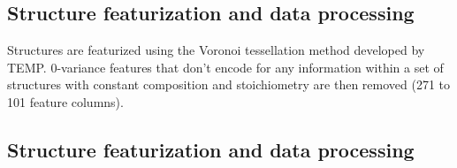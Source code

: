 %




%
%
%



\subsection{Structure featurization and data processing}  %
%
Structures are featurized using the Voronoi tessellation method developed by TEMP.
%
0-variance features that don't encode for any information within a set of structures with constant composition and stoichiometry are then removed (\num{271} to \num{101} feature columns).


\subsection{Structure featurization and data processing}  %
%

